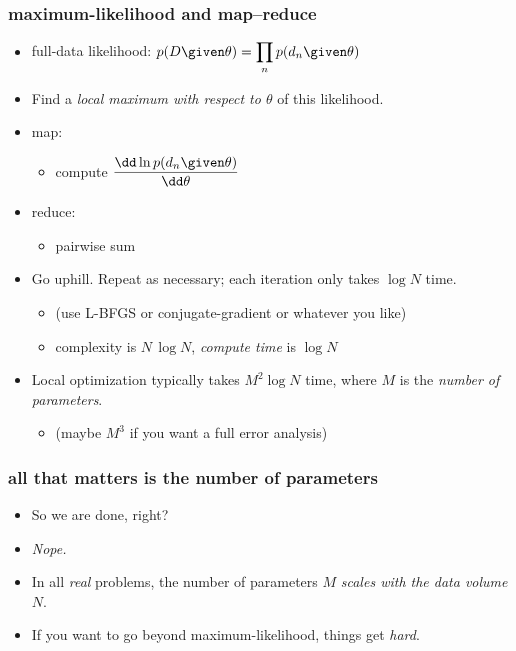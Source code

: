 \documentclass[pdftex]{beamer}
\begin{document}
\begin{frame}
  \frametitle{maximum-likelihood and map--reduce}
  \begin{itemize}
  \item full-data likelihood: $\displaystyle p(D\given\theta) =
    \prod_n p(d_n\given\theta)$
  \item Find a \emph{local maximum with respect to $\theta$} of this
    likelihood.
  \item map:
    \begin{itemize}
    \item compute $\displaystyle\frac{\dd \ln p(d_n\given\theta)}{\dd\theta}$
    \end{itemize}
  \item reduce:
    \begin{itemize}
    \item pairwise sum
    \end{itemize}
  \item Go uphill.  Repeat as necessary; each iteration only takes
    $\log N$ time.
    \begin{itemize}
    \item (use L-BFGS or conjugate-gradient or whatever you like)
    \item complexity is $N\,\log N$, \emph{compute time} is $\log N$
    \end{itemize}
  \item Local optimization typically takes $M^2\log N$ time, where $M$ is the \emph{number of parameters}.
    \begin{itemize}
    \item (maybe $M^3$ if you want a full error analysis)
    \end{itemize}
  \end{itemize}
\end{frame}

\begin{frame}
  \frametitle{all that matters is the number of parameters}
  \begin{itemize}
  \item So we are done, right?
  \item<2-> \emph{Nope.}
  \item<2-> In all \emph{real} problems, the number of parameters $M$ \emph{scales with the data volume $N$}.
  \item<2-> If you want to go beyond maximum-likelihood, things get \emph{hard}.
  \end{itemize}
\end{frame}
\end{document}

